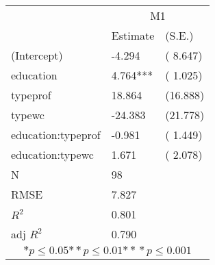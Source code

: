\begin{tabular}{*{3}{l}}
\hline
                  & \multicolumn{2}{c}{M1}   \tabularnewline
                   &Estimate  &(S.E.)  \tabularnewline
 \hline
 \hline
   (Intercept)     &-4.294   &   ( 8.647) \tabularnewline
   education       &4.764***   &   ( 1.025) \tabularnewline
   typeprof        &18.864   &   (16.888) \tabularnewline
   typewc          &-24.383   &   (21.778) \tabularnewline
   education:typeprof    &-0.981   &   ( 1.449) \tabularnewline
   education:typewc    &1.671   &   ( 2.078) \tabularnewline
 \hline
 N                 &98       &        \tabularnewline
 RMSE             &7.827         & \tabularnewline
 $R^2$             &0.801         & \tabularnewline
 adj $R^2$         &0.790         & \tabularnewline
 \hline
\hline
 
 \multicolumn{3}{c}{${*  p}\le 0.05$${*\!\!*  p}\le 0.01$${*\!\!*\!\!*  p}\le 0.001$}\tabularnewline
 \end{tabular}
